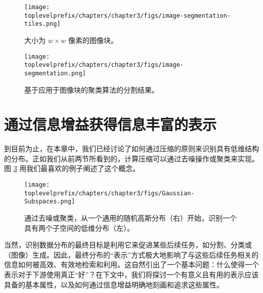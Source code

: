 \documentclass[../../book-main.tex]{subfiles}
\begin{document}
\begin{figure}
	\centering
	\texttt{[image: \\toplevelprefix/chapters/chapter3/figs/image-segmentation-tiles.png]}
	\caption{大小为 $w\times w$ 像素的图像块。}
	\label{fig:image-patch}
\end{figure}

\begin{figure}[th]
	\centering
	\texttt{[image: \\toplevelprefix/chapters/chapter3/figs/image-segmentation.png]}
	\caption{基于应用于图像块的聚类算法的分割结果。}
	\label{fig:image-segmentation}
\end{figure}

\section{通过信息增益获得信息丰富的表示}
\label{sec:chap4-representation-learning-problem}




到目前为止，在本章中，我们已经讨论了如何通过压缩的原则来识别具有低维结构的分布。正如我们从前两节所看到的，计算压缩可以通过去噪操作或聚类来实现。图 \ref{fig:Gaussian-Subspaces} 用我们最喜欢的例子阐述了这个概念。
\begin{figure}[t]
    \centering
    \texttt{[image: \\toplevelprefix/chapters/chapter3/figs/Gaussian-Subspaces.png]}
    \caption{通过去噪或聚类，从一个通用的随机高斯分布（右）开始，识别一个具有两个子空间的低维分布（左）。}
    \label{fig:Gaussian-Subspaces}
\end{figure}
当然，识别数据分布的最终目标是利用它来促进某些后续任务，如分割、分类或（图像）生成。因此，最终分布的“表示”方式极大地影响了与这些后续任务相关的信息如何被高效、有效地检索和利用。这自然引出了一个基本问题：什么使得一个表示对于下游使用真正“好”？在下文中，我们将探讨一个有意义且有用的表示应该具备的基本属性，以及如何通过信息增益明确地刻画和追求这些属性。

\end{document}
